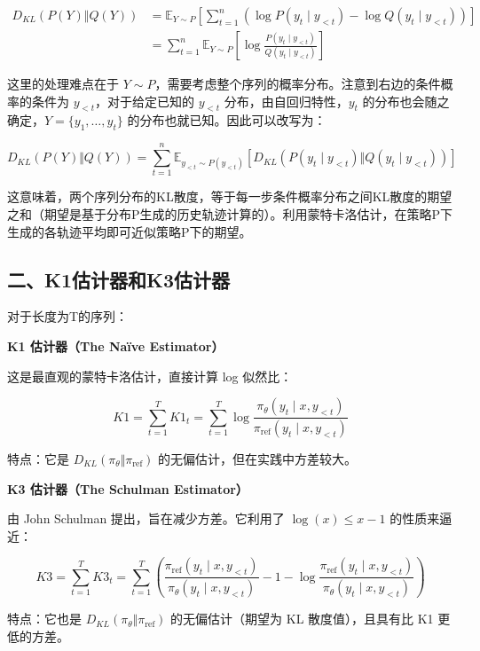 \[
\begin{aligned}
D_{KL}(P(Y) \Vert Q(Y))
&= \mathbb{E}_{Y\sim P}\left[\sum_{t=1}^{n}\left(\log P(y_t\mid y_{<t})-\log Q(y_t\mid y_{<t})\right)\right] \\
&= \sum_{t=1}^{n}\mathbb{E}_{Y\sim P}\left[\log\frac{P(y_t\mid y_{<t})}{Q(y_t\mid y_{<t})}\right]
\end{aligned}
\]

这里的处理难点在于 \(Y\sim P\)，需要考虑整个序列的概率分布。注意到右边的条件概率的条件为 \(y_{<t}\)，对于给定已知的 \(y_{<t}\) 分布，由自回归特性，\(y_t\) 的分布也会随之确定，\(Y=\{y_1,\ldots,y_t\}\) 的分布也就已知。因此可以改写为：

\[
D_{KL}(P(Y) \Vert Q(Y))
=\sum_{t=1}^{n}\mathbb{E}_{y_{<t}\sim P(y_{<t})}\left[
D_{KL}\left(P(y_t\mid y_{<t}) \Vert Q(y_t\mid y_{<t})\right)
\right]
\]

这意味着，两个序列分布的KL散度，等于每一步条件概率分布之间KL散度的期望之和（期望是基于分布P生成的历史轨迹计算的）。利用蒙特卡洛估计，在策略P下生成的各轨迹平均即可近似策略P下的期望。

\hypertarget{ux4e8ck1ux4f30ux8ba1ux5668ux548ck3ux4f30ux8ba1ux5668}{%
\subsection{二、K1估计器和K3估计器}\label{ux4e8ck1ux4f30ux8ba1ux5668ux548ck3ux4f30ux8ba1ux5668}}

对于长度为T的序列：

\textbf{K1 估计器（The Naïve Estimator）}

这是最直观的蒙特卡洛估计，直接计算 log 似然比：

\[
K1=\sum_{t=1}^{T}K1_t
=\sum_{t=1}^{T}\log\frac{\pi_\theta(y_t\mid x,y_{<t})}{\pi_{\mathrm{ref}}(y_t\mid x,y_{<t})}
\]

特点：它是 \(D_{KL}(\pi_\theta \Vert \pi_{\mathrm{ref}})\) 的无偏估计，但在实践中方差较大。

\textbf{K3 估计器（The Schulman Estimator）}

由 John Schulman 提出，旨在减少方差。它利用了 \(\log(x)\le x-1\) 的性质来逼近：

\[
K3=\sum_{t=1}^{T}K3_t
=\sum_{t=1}^{T}\left(
\frac{\pi_{\mathrm{ref}}(y_t\mid x,y_{<t})}{\pi_\theta(y_t\mid x,y_{<t})}
-1
-\log\frac{\pi_{\mathrm{ref}}(y_t\mid x,y_{<t})}{\pi_\theta(y_t\mid x,y_{<t})}
\right)
\]

特点：它也是 \(D_{KL}(\pi_\theta \Vert \pi_{\mathrm{ref}})\) 的无偏估计（期望为 KL 散度值），且具有比 K1 更低的方差。

